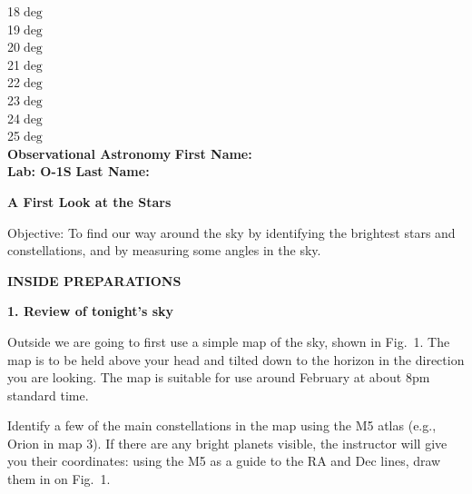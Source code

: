 \documentclass[12pt]{article}
\begin{document}
{\hfill 18$\deg$\makebox[2cm]{\hrulefill} \\
\vspace{-0.028cm}
\hfill 19$\deg$\makebox[2cm]{\hrulefill} \\
\vspace{-0.028cm}
\hfill 20$\deg$\makebox[2cm]{\hrulefill} \\
\vspace{-0.028cm}
\hfill 21$\deg$\makebox[2cm]{\hrulefill} \\
\vspace{-0.028cm}
\hfill 22$\deg$\makebox[2cm]{\hrulefill} \\
\vspace{-0.028cm}
\hfill 23$\deg$\makebox[2cm]{\hrulefill} \\
\vspace{-0.028cm}
\hfill 24$\deg$\makebox[2cm]{\hrulefill} \\
\vspace{-0.028cm}
\hfill 25$\deg$\makebox[2cm]{\hrulefill} \\
}
\noindent
{\bf Observational Astronomy    \hfill} {\bf First Name:\makebox[4cm]{\hrulefill}}\\
{\bf Lab: O-1S} \hfill {\bf Last Name:\makebox[4cm]{\hrulefill}}


\bigskip

\medskip

\noindent
{\hfill \Large {\bf A First Look at the Stars} \hfill}


\bigskip

\noindent
{Objective:} To find our way around the sky by identifying the
brightest stars and constellations, and by measuring some angles
in the sky.

\bigskip\noindent
{\bf INSIDE PREPARATIONS}
\bigskip

\noindent
{\bf 1. Review of tonight's sky}

\medskip
\noindent
Outside we are going to first use a simple map of the sky, shown in
Fig.~1.  The map is to be held above your head and tilted down to the
horizon in the direction you are looking. The map is suitable for use
around February at about 8pm standard time.

Identify a few of the main constellations in the map using the M5
atlas (e.g., Orion in map 3). If there are any bright planets visible,
the instructor will give you their coordinates: using the M5 as a
guide to the RA and Dec lines, draw them in on Fig.~1.
\end{document}

